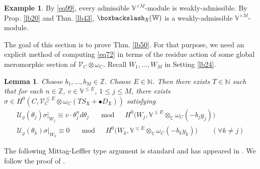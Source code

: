 \documentclass[11pt,b5paper,notitlepage]{article}
\theoremstyle{definition}
\newtheorem{eg}[df]{Example}
\theoremstyle{plain}
\newtheorem{lm}[df]{Lemma}
\newcommand{\fk}{\mathfrak}
\newcommand{\mc}{\mathcal}
\newcommand{\scr}{\mathscr}
\newcommand{\SX}{{S_{\fk X}}}
\newcommand{\DX}{D_{\fk X}}
\newcommand{\blt}{\bullet}
\newcommand{\Vbb}{\mathbb V}
\newcommand{\Wbb}{\mathbb W}
\newcommand{\Cbb}{\mathbb C}
\newcommand{\Nbb}{\mathbb N}
\newcommand{\Zbb}{\mathbb Z}
\newcommand{\<}{\left\langle}
\renewcommand{\>}{\right\rangle}
\newcommand{\fx}{\mathfrak{X}}
\newcommand{\bbs}{\boxbackslash}
\numberwithin{equation}{section}
\begin{document}
\begin{eg}
By \eqref{eq99}, every admissible $\Vbb^{\times M}$-module is weakly-admissible. By Prop. \ref{lb20} and Thm. \ref{lb43}, $\bbs_\fx(\Wbb)$ is a weakly-admissible $\Vbb^{\times M}$-module.
\end{eg}


The goal of this section is to prove Thm. \ref{lb50}. For that purpose, we need an explicit method of computing \eqref{eq72} in terms of the residue action of some global meromorphic section of $\scr V_C\otimes\omega_C$. Recall $W_1,\dots,W_M$ in Setting \ref{lb24}.



\begin{lm}\label{lb51}
Choose $b_1,\dots,b_M\in\Zbb$. Choose $E\in\Nbb$. Then there exists $T\in\Nbb$ such that for each $n\in\Zbb$, $v\in\Vbb^{\leq E}$, $1\leq j\leq M$,  there exists $\sigma\in H^0(C,\scr V_C^{\leq E}\otimes\omega_C(T\SX+\blt\DX))$   satisfying 
\begin{subequations}\label{eq122}
\begin{gather}
\mc U_\varrho(\theta_j)\sigma\big|_{W_j}\equiv v\cdot  \theta_j^nd\theta_j\quad\mod\quad H^0\big(W_j,\Vbb^{\leq E}\otimes_\Cbb\omega_C(-b_jy_j)\big) \\
\mc U_\varrho(\theta_k)\sigma\big |_{W_k}\equiv 0\quad\mod\quad H^0\big(W_k,\Vbb^{\leq E}\otimes_\Cbb\omega_C(-b_ky_k)\big)\qquad(\forall k\neq j)
\end{gather}
\end{subequations}
\end{lm}

The following Mittag-Leffler type argument is standard and has appeared in \cite{AN03-finite-dimensional,KZ-conformal-block,DGT2}. We follow the proof of \cite[Thm. 12.1]{Gui-sewingconvergence}.
\end{document}
